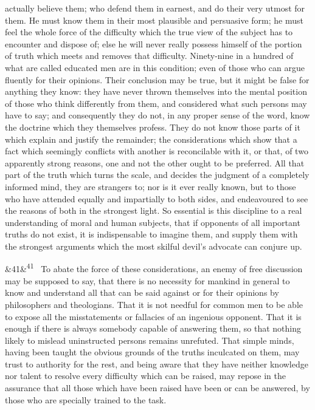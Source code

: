 \documentclass[12pt]{article}
\newcommand{\para}[1][]{\par\noindent\ifx&#1&\else\textsuperscript{\footnotesize #1}~\fi}
\begin{document}
actually believe them; who defend them in earnest, and do their very utmost for them. He must know them in their most plausible and persuasive form; he must feel the whole force of the difficulty which the true view of the subject has to encounter and dispose of; else he will never really possess himself of the portion of truth which meets and removes that difficulty. Ninety-nine in a hundred of what are called educated men are in this condition; even of those who can argue fluently for their opinions. Their conclusion may be true, but it might be false for anything they know: they have never thrown themselves into the mental position of those who think differently from them, and considered what such persons may have to say; and consequently they do not, in any proper sense of the word, know the doctrine which they themselves profess. They do not know those parts of it which explain and justify the remainder; the considerations which show that a fact which seemingly conflicts with another is reconcilable with it, or that, of two apparently strong reasons, one and not the other ought to be preferred. All that part of the truth which turns the scale, and decides the judgment of a completely informed mind, they are strangers to; nor is it ever really known, but to those who have attended equally and impartially to both sides, and endeavoured to see the reasons of both in the strongest light. So essential is this discipline to a real understanding of moral and human subjects, that if opponents of all important truths do not exist, it is indispensable to imagine them, and supply them with the strongest arguments which the most skilful devil's advocate can conjure up.

\para[41] To abate the force of these considerations, an enemy of free discussion may be supposed to say, that there is no necessity for mankind in general to know and understand all that can be said against or for their opinions by philosophers and theologians. That it is not needful for common men to be able to expose all the misstatements or fallacies of an ingenious opponent. That it is enough if there is always somebody capable of answering them, so that nothing likely to mislead uninstructed persons remains unrefuted. That simple minds, having been taught the obvious grounds of the truths inculcated on them, may trust to authority for the rest, and being aware that they have neither knowledge nor talent to resolve every difficulty which can be raised, may repose in the assurance that all those which have been raised have been or can be answered, by those who are specially trained to the task.
\end{document}
